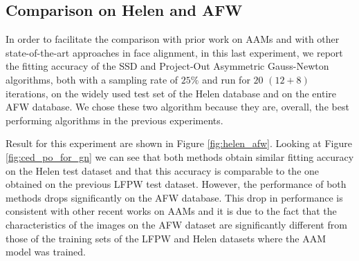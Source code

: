 \subsection{Comparison on Helen and AFW}

In order to facilitate the comparison with prior work on AAMs \cite{} and with other state-of-the-art approaches in face alignment, in this last experiment, we report the fitting accuracy of the SSD and Project-Out Asymmetric Gauss-Newton algorithms, both with a sampling rate of $25\%$ and run for $20$ $(12 + 8)$ iterations, on the widely used test set of the Helen database and on the entire AFW database. We chose these two algorithm because they are, overall, the best performing algorithms in the previous experiments.

Result for this experiment are shown in Figure \ref{fig:helen_afw}. Looking at Figure \ref{fig:ced_po_for_gn} we can see that both methods obtain similar fitting accuracy on the Helen test dataset and that this accuracy is comparable to the one obtained on the previous LFPW test dataset. However, the performance of both methods drops significantly on the AFW database. This drop in performance is consistent with other recent works on AAMs \cite{Tzimiropoulos2014, Alabort2014, Antonakos2014, Alabort2015} and it is due to the fact that the characteristics of the images on the AFW dataset are significantly different from those of the training sets of the LFPW and Helen datasets where the AAM model was trained.

